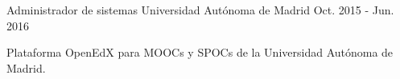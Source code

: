 \begin{cventries}
  \cventry
    {Administrador de sistemas} %
    {Universidad Autónoma de Madrid} %
    {} %
    {Oct. 2015 - Jun. 2016} %
    {
      \begin{cvitems} %
        \item {Plataforma OpenEdX para MOOCs y SPOCs de la Universidad Autónoma de Madrid.}
      \end{cvitems}
    }
\end{cventries}
